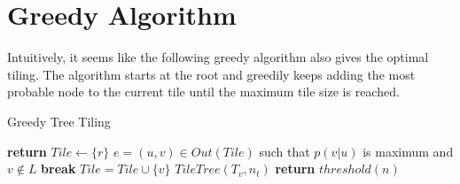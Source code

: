 \section{Greedy Algorithm}

Intuitively, it seems like the following greedy algorithm also gives the optimal tiling. The algorithm starts at the root and greedily keeps adding the most probable node to the current tile until the maximum tile size is reached.
\begin{algorithm}
    \caption{Greedy Tree Tiling}
    \label{GreedyTilingAlgo}
    \begin{algorithmic}
                \State \textbf{return}
            \EndIf
            \State $Tile \leftarrow \{ r \}$
                \State $e = (u,v) \in Out(Tile)$ such that $p(v | u)$ is maximum and $v \notin L$
                    \State \textbf{break}
                \EndIf
                \State $Tile = Tile \cup \{ v \}$
            \EndWhile 
                \State $TileTree(T_v, n_t)$
            \EndFor
            \State \textbf{return} $threshold(n)$
        \EndProcedure
    \end{algorithmic}
\end{algorithm}
